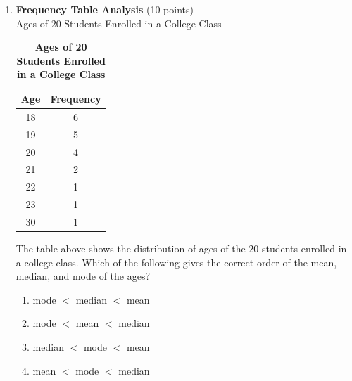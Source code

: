 \begin{enumerate}
  \newpage

  \item \textbf{Frequency Table Analysis} (10 points)\\
  Ages of 20 Students Enrolled in a College Class
  \begin{table}[h!]
  \centering
  \renewcommand{\arraystretch}{1.3}
  \setlength{\tabcolsep}{8pt}
  \caption*{\textbf{Ages of 20 Students Enrolled in a College Class}}
  \begin{tabular}{|c|c|}
  \hline
  \rowcolor[HTML]{E0E0E0}
  \textbf{Age} & \textbf{Frequency} \\
  \hline
  18 & 6 \\
  \hline
  19 & 5 \\
  \hline
  20 & 4 \\
  \hline
  21 & 2 \\
  \hline
  22 & 1 \\
  \hline
  23 & 1 \\
  \hline
  30 & 1 \\
  \hline
  \end{tabular}
  \end{table}
  The table above shows the distribution of ages of the 20 students enrolled in a college class. Which of the following gives the correct order of the mean, median, and mode of the ages?
  \begin{enumerate}[label=(\Alph*)]
    \item mode $<$ median $<$ mean
    \item mode $<$ mean $<$ median
    \item median $<$ mode $<$ mean
    \item mean $<$ mode $<$ median
  \end{enumerate}

  \begin{subanswer}
  \end{subanswer}


\end{enumerate}
